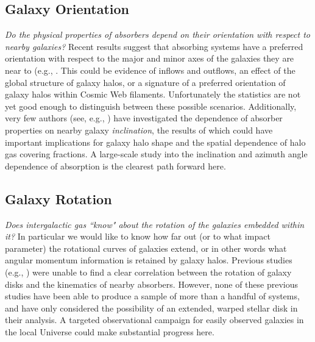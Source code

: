 \documentclass[twocolumn,tighten]{aastex62}
\newcommand{\II}{\,{\sc ii}}
\newcommand{\VI}{\,{\sc vi}}
\begin{document}
\subsection{Galaxy Orientation}
\emph{Do the physical properties of absorbers depend on their orientation with respect to nearby galaxies?} Recent results suggest that absorbing systems have a preferred orientation with respect to the major and minor axes of the galaxies they are near to (e.g., \citealt{kacprzak2011_inclination, kacprzak2012}. This could be evidence of inflows and outflows, an effect of the global structure of galaxy halos, or a signature of a preferred orientation of galaxy halos within Cosmic Web filaments. Unfortunately the statistics are not yet good enough to distinguish between these possible scenarios. Additionally, very few authors (see, e.g., \cite{mathes2014, bordoloi2014}) have investigated the dependence of absorber properties on nearby galaxy \emph{inclination}, the results of which could have important implications for galaxy halo shape and the spatial dependence of halo gas covering fractions. A large-scale study into the inclination and azimuth angle dependence of absorption is the clearest path forward here.


\subsection{Galaxy Rotation}
\emph{Does intergalactic gas ``know" about the rotation of the galaxies embedded within it?} In particular we would like to know how far out (or to what impact parameter) the rotational curves of galaxies extend, or in other words what angular momentum information is retained by galaxy halos. Previous studies (e.g., \citealt{steidel2002, cote2005, wakker2009, kacprzak2011_kinematics}) were unable to find a clear correlation between the rotation of galaxy disks and the kinematics of nearby absorbers. However, none of these previous studies have been able to produce a sample of more than a handful of systems, and have only considered the possibility of an extended, warped stellar disk in their analysis. A targeted observational campaign for easily observed galaxies in the local Universe could make substantial progress here.
\end{document}
